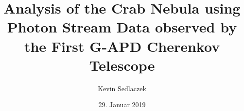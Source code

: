 \documentclass[
  tucolor,
  BCOR=12mm,     %
  parskip=half,  %
  open=any,      %
  cleardoublepage=plain,  %
]{tudothesis}
\author{Kevin Sedlaczek}
\title{Analysis of the Crab Nebula using Photon Stream Data observed by the First G-APD Cherenkov Telescope}
\date{29. Januar 2019}
\begin{document}
\frontmatter
% 
\maketitle

\makecorrectorpage


\tableofcontents

\mainmatter












\appendix


\backmatter
\printbibliography

\cleardoublepage

\end{document}
